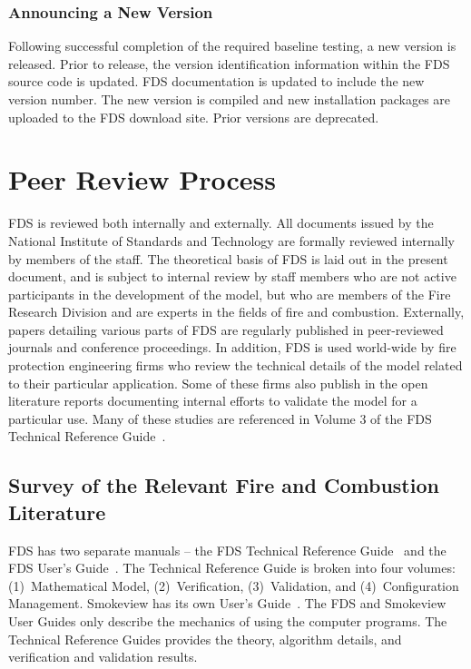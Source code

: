 \documentclass[11pt]{book}
\begin{document}
\subsection{Announcing a New Version}

Following successful completion of the required baseline testing, a new version is released.  Prior to release, the version identification information within the FDS source code is updated.  FDS documentation is updated to include the new version number.  The new version is compiled and new installation packages are uploaded to the FDS download site.  Prior versions are deprecated.




\chapter{Peer Review Process}

FDS is reviewed both internally and externally. All documents issued by the National Institute of Standards and Technology are formally reviewed internally by members of the staff. The theoretical basis of FDS is laid out in the present document, and is subject to internal review by staff members who are not active participants in the development of the model, but who are members of the Fire Research Division and are experts in the fields of fire and combustion. Externally, papers detailing various parts of FDS are regularly published in peer-reviewed journals and conference proceedings. In addition, FDS is used world-wide by fire protection engineering firms who review the technical details of the model related to their particular application. Some of these firms also publish in the open literature reports documenting internal efforts to validate the model for a particular use. Many of these studies are referenced in Volume 3 of the FDS Technical Reference Guide~\cite{FDS_Tech_Guide}.


\section{Survey of the Relevant Fire and Combustion Literature}

\label{Relevantdocs}

FDS has two separate manuals -- the FDS Technical Reference Guide~\cite{FDS_Tech_Guide} and the FDS User's Guide~\cite{FDS_Users_Guide}. The Technical Reference Guide is broken into four volumes: (1)~Mathematical Model, (2)~Verification, (3)~Validation, and (4)~Configuration Management. Smokeview has its own User's Guide~\cite{Smokeview_Users_Guide}. The FDS and Smokeview User Guides only describe the mechanics of using the computer programs. The Technical Reference Guides provides the theory, algorithm details, and verification and validation results.
\end{document}
